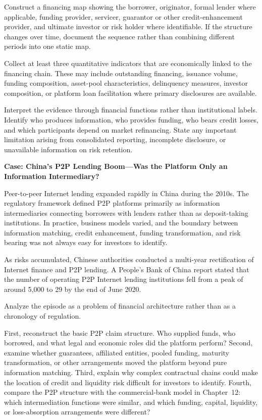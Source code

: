 Construct a financing map showing the borrower, originator, formal lender where applicable, funding provider, servicer, guarantor or other credit-enhancement provider, and ultimate investor or risk holder where identifiable. If the structure changes over time, document the sequence rather than combining different periods into one static map.

Collect at least three quantitative indicators that are economically linked to the financing chain. These may include outstanding financing, issuance volume, funding composition, asset-pool characteristics, delinquency measures, investor composition, or platform loan facilitation where primary disclosures are available.

Interpret the evidence through financial functions rather than institutional labels. Identify who produces information, who provides funding, who bears credit losses, and which participants depend on market refinancing. State any important limitation arising from consolidated reporting, incomplete disclosure, or unavailable information on risk retention.



\textbf{Case: China's P2P Lending Boom---Was the Platform Only an Information Intermediary?}

Peer-to-peer Internet lending expanded rapidly in China during the 2010s. The regulatory framework defined P2P platforms primarily as information intermediaries connecting borrowers with lenders rather than as deposit-taking institutions. In practice, business models varied, and the boundary between information matching, credit enhancement, funding transformation, and risk bearing was not always easy for investors to identify.

As risks accumulated, Chinese authorities conducted a multi-year rectification of Internet finance and P2P lending. A People's Bank of China report stated that the number of operating P2P Internet lending institutions fell from a peak of around 5,000 to 29 by the end of June 2020.

Analyze the episode as a problem of financial architecture rather than as a chronology of regulation.

First, reconstruct the basic P2P claim structure. Who supplied funds, who borrowed, and what legal and economic roles did the platform perform? Second, examine whether guarantees, affiliated entities, pooled funding, maturity transformation, or other arrangements moved the platform beyond pure information matching. Third, explain why complex contractual chains could make the location of credit and liquidity risk difficult for investors to identify. Fourth, compare the P2P structure with the commercial-bank model in Chapter~12: which intermediation functions were similar, and which funding, capital, liquidity, or loss-absorption arrangements were different?

